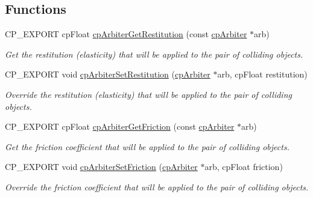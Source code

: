 \subsection*{Functions}
\begin{DoxyCompactItemize}
\item 
\mbox{\label{group__cpArbiter_ga6c9e28294c87dc6a5777b0f0c24fda83}} 
C\+P\+\_\+\+E\+X\+P\+O\+RT cp\+Float \hyperlink{group__cpArbiter_ga6c9e28294c87dc6a5777b0f0c24fda83}{cp\+Arbiter\+Get\+Restitution} (const \hyperlink{structcpArbiter}{cp\+Arbiter} $\ast$arb)
\begin{DoxyCompactList}\small\item\em Get the restitution (elasticity) that will be applied to the pair of colliding objects. \end{DoxyCompactList}\item 
\mbox{\label{group__cpArbiter_gaefa04fa347992f1e5903c89e480325ee}} 
C\+P\+\_\+\+E\+X\+P\+O\+RT void \hyperlink{group__cpArbiter_gaefa04fa347992f1e5903c89e480325ee}{cp\+Arbiter\+Set\+Restitution} (\hyperlink{structcpArbiter}{cp\+Arbiter} $\ast$arb, cp\+Float restitution)
\begin{DoxyCompactList}\small\item\em Override the restitution (elasticity) that will be applied to the pair of colliding objects. \end{DoxyCompactList}\item 
\mbox{\label{group__cpArbiter_ga367b1ad68643be3f0a5f979ddf27b575}} 
C\+P\+\_\+\+E\+X\+P\+O\+RT cp\+Float \hyperlink{group__cpArbiter_ga367b1ad68643be3f0a5f979ddf27b575}{cp\+Arbiter\+Get\+Friction} (const \hyperlink{structcpArbiter}{cp\+Arbiter} $\ast$arb)
\begin{DoxyCompactList}\small\item\em Get the friction coefficient that will be applied to the pair of colliding objects. \end{DoxyCompactList}\item 
\mbox{\label{group__cpArbiter_gab049136b2e62e92adfde8f6422664f71}} 
C\+P\+\_\+\+E\+X\+P\+O\+RT void \hyperlink{group__cpArbiter_gab049136b2e62e92adfde8f6422664f71}{cp\+Arbiter\+Set\+Friction} (\hyperlink{structcpArbiter}{cp\+Arbiter} $\ast$arb, cp\+Float friction)
\begin{DoxyCompactList}\small\item\em Override the friction coefficient that will be applied to the pair of colliding objects. \end{DoxyCompactList}\item 

\end{DoxyCompactItemize}
